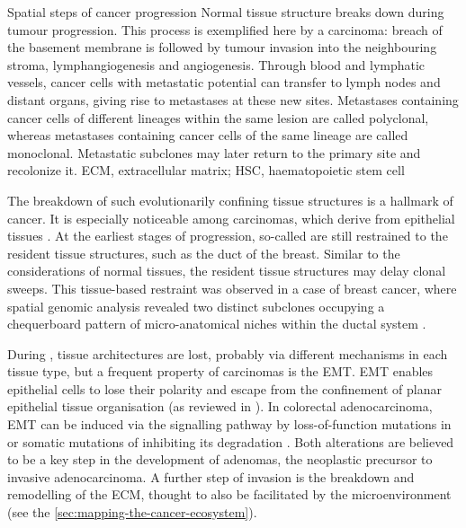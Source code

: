     {Spatial steps of cancer progression \parencite{Seferbekova2023-wg}}
    {Normal tissue structure breaks down during tumour progression. This process is exemplified here by a carcinoma: breach of the basement membrane is followed by tumour invasion into the neighbouring stroma, lymphangiogenesis and angiogenesis. Through blood and lymphatic vessels, cancer cells with metastatic potential can transfer to lymph nodes and distant organs, giving rise to metastases at these new sites. Metastases containing cancer cells of different lineages within the same lesion are called polyclonal, whereas metastases containing cancer cells of the same lineage are called monoclonal. Metastatic subclones may later return to the primary site and recolonize it. ECM, extracellular matrix; HSC, haematopoietic stem cell}

The breakdown of such evolutionarily confining tissue structures is a hallmark of cancer. It is especially noticeable among carcinomas, which derive from epithelial tissues . At the earliest stages of progression, so-called  are still restrained to the resident tissue structures, such as the duct of the breast. Similar to the considerations of normal tissues, the resident tissue structures may delay clonal sweeps. This tissue-based restraint was observed in a case of breast cancer, where spatial genomic analysis revealed two distinct subclones occupying a chequerboard pattern of micro-anatomical niches within the ductal system \parencite{Lomakin2022-ks}.

During , tissue architectures are lost, probably via different mechanisms in each tissue type, but a frequent property of carcinomas is the \ac{EMT}. \ac{EMT} enables epithelial cells to lose their polarity and escape from the confinement of planar epithelial tissue organisation (as reviewed in \textcite{Polyak2009-fi}). In colorectal adenocarcinoma, \ac{EMT} can be induced via the  signalling pathway by loss-of-function mutations in  or somatic mutations of  inhibiting its degradation \parencite{Morin1997-ez}. Both alterations are believed to be a key step in the development of adenomas, the neoplastic precursor to invasive adenocarcinoma. A further step of invasion is the breakdown and remodelling of the \ac{ECM}, thought to also be facilitated by the microenvironment (see the \cref{sec:mapping-the-cancer-ecosystem}).

